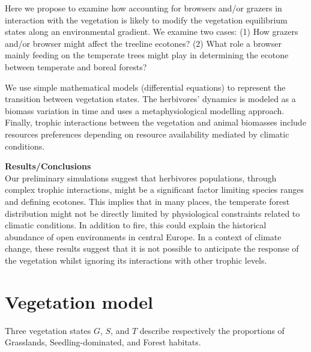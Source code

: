 \vspace{1em}

Here we propose to examine how accounting for browsers and/or grazers in
interaction with the vegetation is likely to modify the vegetation equilibrium
states along an environmental gradient. We examine two cases: (1) How grazers
and/or browser might affect the treeline ecotones? (2) What role a browser
mainly feeding on the temperate trees might play in determining the ecotone
between temperate and boreal forests?

\vspace{1em}

We use simple mathematical models (differential equations) to represent the
transition between vegetation states. The herbivores' dynamics is modeled as a
biomass variation in time and uses a metaphysiological modelling approach.
Finally, trophic interactions between the vegetation and animal biomasses
include resources preferences depending on resource availability mediated by
climatic conditions.

\vspace{1em}

\textbf{Results/Conclusions}\\

Our preliminary simulations suggest that herbivores populations, through
complex trophic interactions, might be a significant factor limiting species
ranges and defining ecotones. This implies that in many places, the temperate
forest distribution might not be directly limited by physiological constraints
related to climatic conditions. In addition to fire, this could explain the
historical abundance of open environments in central Europe. In a context of
climate change, these results suggest that it is not possible to anticipate
the response of the vegetation whilst ignoring its interactions with other
trophic levels.




\newpage
\section{Vegetation model}

Three vegetation states $G$, $S$, and $T$ describe respectively the
proportions of Grasslands, Seedling-dominated, and Forest habitats.

